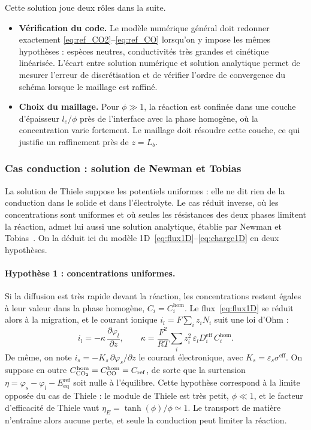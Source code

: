 Cette solution joue deux rôles dans la suite.
\begin{itemize}
    \item \textbf{Vérification du code.} Le modèle numérique général doit
    redonner exactement \eqref{eq:ref_CO2}--\eqref{eq:ref_CO} lorsqu'on y
    impose les mêmes hypothèses : espèces neutres, conductivités très grandes
    et cinétique linéarisée. L'écart entre solution numérique et solution
    analytique permet de mesurer l'erreur de discrétisation et de vérifier
    l'ordre de convergence du schéma lorsque le maillage est raffiné.
    \item \textbf{Choix du maillage.} Pour $\phi \gg 1$, la réaction est
    confinée dans une couche d'épaisseur $l_e/\phi$ près de l'interface avec
    la phase homogène, où la concentration varie fortement. Le maillage doit
    résoudre cette couche, ce qui justifie un raffinement près de $z = L_b$.
\end{itemize}

\subsubsection*{Cas conduction : solution de Newman et Tobias}

La solution de Thiele suppose les potentiels uniformes : elle ne dit rien de
la conduction dans le solide et dans l'électrolyte. Le cas réduit inverse,
où les concentrations sont uniformes et où seules les résistances des deux
phases limitent la réaction, admet lui aussi une solution analytique,
établie par Newman et Tobias~\cite{newman1962}. On la déduit ici du modèle
1D~\eqref{eq:flux1D}--\eqref{eq:charge1D} en deux hypothèses.

\paragraph{Hypothèse 1 : concentrations uniformes.} Si la diffusion est très
rapide devant la réaction, les concentrations restent égales à leur valeur
dans la phase homogène, $C_i = C_i^{\mathrm{hom}}$. Le flux~\eqref{eq:flux1D}
se réduit alors à la migration, et le courant ionique
$i_l = F\sum_i z_i N_i$ suit une loi d'Ohm :
\begin{equation}
i_l = -\kappa\,\frac{\partial \varphi_l}{\partial z},
\qquad
\kappa = \frac{F^2}{RT}\sum_i z_i^2\,\varepsilon_l D_i^{\mathrm{eff}}\,C_i^{\mathrm{hom}} .
\label{eq:NT_kappa}
\end{equation}
De même, on note $i_s = -K_s\,\partial\varphi_s/\partial z$ le courant
électronique, avec $K_s = \varepsilon_s\sigma^{\mathrm{eff}}$. On suppose en
outre $C_{\ce{CO2}}^{\mathrm{hom}} = C_{\ce{CO}}^{\mathrm{hom}} = C_{\mathrm{ref}}$,
de sorte que la surtension
$\eta = \varphi_s - \varphi_l - E_{\mathrm{eq}}^{\mathrm{ref}}$ soit nulle à
l'équilibre. Cette hypothèse correspond à la limite opposée du cas de Thiele :
le module de Thiele est très petit, $\phi \ll 1$, et le facteur d'efficacité
de Thiele vaut $\eta_E = \tanh(\phi)/\phi \simeq 1$. Le transport de matière
n'entraîne alors aucune perte, et seule la conduction peut limiter la
réaction.

